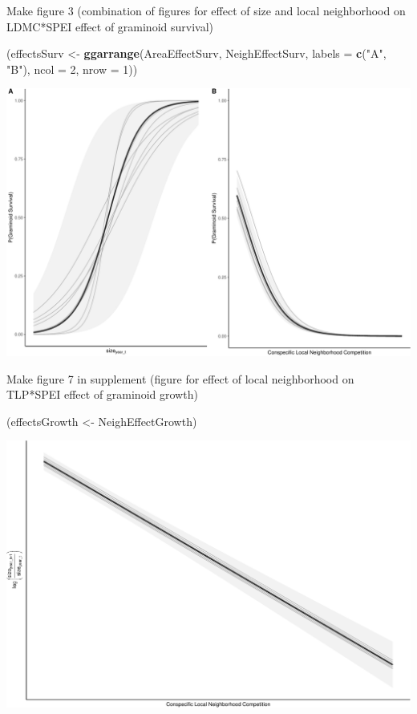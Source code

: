 \documentclass[
]{article}
\newenvironment{Shaded}{\begin{snugshade}}{\end{snugshade}}
\newcommand{\DataTypeTok}[1]{\textcolor[rgb]{0.13,0.29,0.53}{#1}}
\newcommand{\DecValTok}[1]{\textcolor[rgb]{0.00,0.00,0.81}{#1}}
\newcommand{\KeywordTok}[1]{\textcolor[rgb]{0.13,0.29,0.53}{\textbf{#1}}}
\newcommand{\NormalTok}[1]{#1}
\newcommand{\StringTok}[1]{\textcolor[rgb]{0.31,0.60,0.02}{#1}}
\begin{document}
Make figure 3 (combination of figures for effect of size and local
neighborhood on LDMC*SPEI effect of graminoid survival)

\begin{Shaded}
\begin{Highlighting}[]
\NormalTok{(effectsSurv \textless{}{-}}\StringTok{ }\KeywordTok{ggarrange}\NormalTok{(AreaEffectSurv, NeighEffectSurv,}
          \DataTypeTok{labels =} \KeywordTok{c}\NormalTok{(}\StringTok{"A"}\NormalTok{, }\StringTok{"B"}\NormalTok{),}
          \DataTypeTok{ncol =} \DecValTok{2}\NormalTok{, }\DataTypeTok{nrow =} \DecValTok{1}\NormalTok{))}
\end{Highlighting}
\end{Shaded}

\includegraphics{figures/survEffectPlots-1.pdf}

Make figure 7 in supplement (figure for effect of local neighborhood on
TLP*SPEI effect of graminoid growth)

\begin{Shaded}
\begin{Highlighting}[]
\NormalTok{(effectsGrowth \textless{}{-}}\StringTok{ }\NormalTok{NeighEffectGrowth)}
\end{Highlighting}
\end{Shaded}

\includegraphics{figures/growthEffectPlots-1.pdf}
\end{document}
